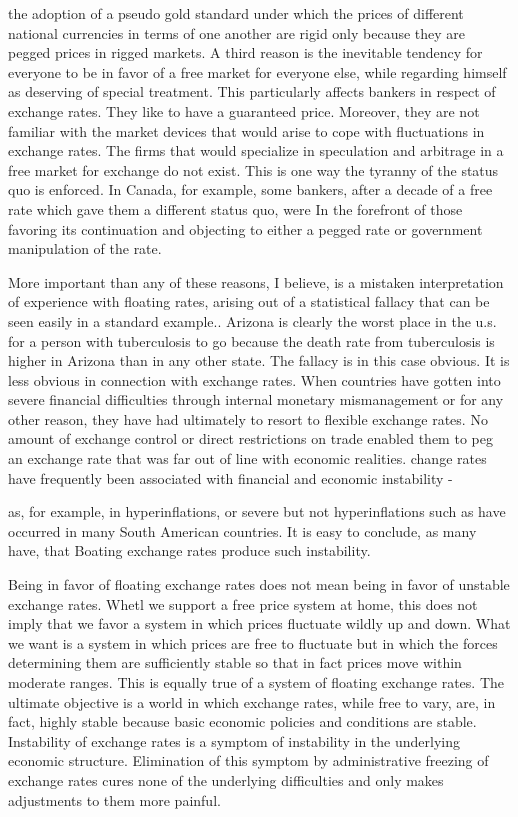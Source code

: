 \documentclass[11pt,openany]{book}
\begin{document}
the adoption of a pseudo gold standard under which the prices of different national currencies in terms of one another are rigid only because they are pegged prices in rigged markets. A third reason is the inevitable tendency for everyone to be in favor of a free market for everyone else, while regarding himself as deserving of special treatment. This particularly affects bankers in respect of exchange rates. They like to have a guaranteed price. Moreover, they are not familiar with the market devices that would arise to cope with fluctuations in exchange rates. The firms that would specialize in speculation and arbitrage in a free market for exchange do not exist. This is one way the tyranny of the status quo is enforced. In Canada, for example, some bankers, after a decade of a free rate which gave them a different status quo, were In the forefront of those favoring its continuation and objecting to either a pegged rate or government manipulation of the rate.

More important than any of these reasons, I believe, is a mistaken interpretation of experience with floating rates, arising out of a statistical fallacy that can be seen easily in a standard example.. Arizona is clearly the worst place in the u.s. for a person with tuberculosis to go because the death rate from tuberculosis is higher in Arizona than in any other state. The fallacy is in this case obvious. It is less obvious in connection with exchange rates. When countries have gotten into severe financial difficulties through internal monetary mismanagement or for any other reason, they have had ultimately to resort to flexible exchange rates. No amount of exchange control or direct restrictions on trade enabled them to peg an exchange rate that was far out of line with economic realities. change rates have frequently been associated with financial and economic instability -

as, for example, in hyperinflations, or severe but not hyperinflations such as have occurred in many South American countries. It is easy to conclude, as many have, that Boating exchange rates produce such instability.

Being in favor of floating exchange rates does not mean being in favor of unstable exchange rates. Whetl we support a free price system at home, this does not imply that we favor a system in which prices fluctuate wildly up and down. What we want is a system in which prices are free to fluctuate but in which the forces determining them are sufficiently stable so that in fact prices move within moderate ranges. This is equally true of a system of floating exchange rates. The ultimate objective is a world in which exchange rates, while free to vary, are, in fact, highly stable because basic economic policies and conditions are stable. Instability of exchange rates is a symptom of instability in the underlying economic structure. Elimination of this symptom by administrative freezing of exchange rates cures none of the underlying difficulties and only makes adjustments to them more painful.
\end{document}
